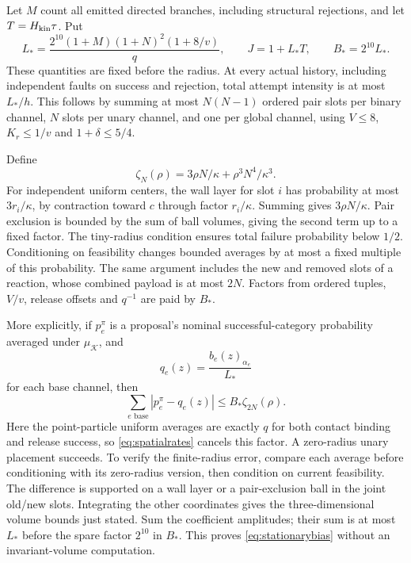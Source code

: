 \documentclass[11pt]{article}
\numberwithin{equation}{section}
\theoremstyle{definition}
\theoremstyle{remark}\newtheorem{remark}[theorem]{Remark}
\newcommand{\K}{\mathcal K}
\begin{document}
Let $M$ count all emitted directed branches, including structural rejections,
and let $T=H_{\rm kin}\tau$. Put
\begin{equation}\label{eq:proposalledger}
 L_*=\frac{2^{10}(1+M)(1+N)^2(1+8/v)}q,
 \qquad J=1+L_*T,\qquad B_*=2^{10}L_*.
\end{equation}
These quantities are fixed before the radius. At every actual history,
including independent faults on success and rejection, total attempt
intensity is at most $L_*/h$. This follows by summing at most $N(N-1)$
ordered pair slots per binary channel, $N$ slots per unary channel, and
one per global channel, using $V\le8$, $K_r\le1/v$ and
$1+\delta\le5/4$.

Define
\begin{equation}\label{eq:zeta}
 \zeta_N(\rho)=3\rho N/\kappa+\rho^3N^4/\kappa^3.
\end{equation}
For independent uniform centers, the wall layer for slot $i$ has probability
at most $3r_i/\kappa$, by contraction toward $c$ through factor
$r_i/\kappa$. Summing gives $3\rho N/\kappa$. Pair exclusion is bounded by the sum of
ball volumes, giving the second term up to a fixed factor. The tiny-radius
condition ensures total failure probability below $1/2$. Conditioning on
feasibility changes bounded averages by at most a fixed multiple of this
probability. The same argument includes the new and removed slots of a
reaction, whose combined payload is at most $2N$. Factors from ordered
tuples, $V/v$, release offsets and $q^{-1}$ are paid by $B_*$.

More explicitly, if $p_e^\pi$ is a proposal's nominal successful-category
probability averaged under $\mu_\K$, and
\begin{equation}\label{eq:referencecategory}
 q_e(z)=\frac{b_e(z)_{\alpha_e}}{L_*}
\end{equation}
for each base channel, then
\begin{equation}\label{eq:stationarybias}
 \sum_{e\text{ base}}|p_e^\pi-q_e(z)|
       \le B_*\zeta_{2N}(\rho).
\end{equation}
Here the point-particle uniform averages are exactly $q$ for both contact
binding and release success, so \eqref{eq:spatialrates} cancels this
factor. A zero-radius unary placement succeeds. To verify the finite-radius
error, compare each average before conditioning with its zero-radius
version, then condition on current feasibility. The difference is supported
on a wall layer or a pair-exclusion ball in the joint old/new slots.
Integrating the other coordinates gives the three-dimensional volume
bounds just stated. Sum the coefficient amplitudes; their sum is at most
$L_*$ before the spare factor $2^{10}$ in $B_*$. This proves
\eqref{eq:stationarybias} without an invariant-volume computation.
\end{document}

